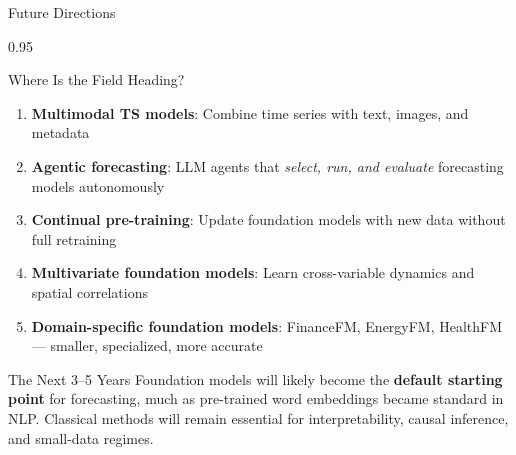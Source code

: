 \documentclass[9pt, aspectratio=169, t]{beamer}
\begin{document}
\begin{frame}{Future Directions}
    \begin{cminipage}{0.95\textwidth}
    \vspace{-0.3cm}
    \begin{block}{Where Is the Field Heading?}
        {\small
        \begin{enumerate}\setlength{\itemsep}{0pt}
            \item \textbf{Multimodal TS models}: Combine time series with text, images, and metadata
            \item \textbf{Agentic forecasting}: LLM agents that \textit{select, run, and evaluate} forecasting models autonomously
            \item \textbf{Continual pre-training}: Update foundation models with new data without full retraining
            \item \textbf{Multivariate foundation models}: Learn cross-variable dynamics and spatial correlations
            \item \textbf{Domain-specific foundation models}: FinanceFM, EnergyFM, HealthFM --- smaller, specialized, more accurate
        \end{enumerate}
        }
    \end{block}
    \vspace{-2mm}
    \begin{exampleblock}{The Next 3--5 Years}
        {\small Foundation models will likely become the \textbf{default starting point} for forecasting, much as pre-trained word embeddings became standard in NLP. Classical methods will remain essential for interpretability, causal inference, and small-data regimes.}
    \end{exampleblock}
    \end{cminipage}
\end{frame}
\end{document}
